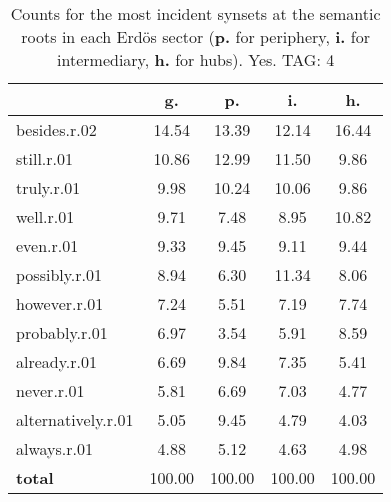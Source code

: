 \begin{table}[h!]
\begin{center}
\begin{tabular}{| l | c | c | c | c |}\hline
 & g. & p. & i. & h. \\\hline
besides.r.02 & 14.54  & 13.39  & 12.14  & 16.44 \\\hline
still.r.01 & 10.86  & 12.99  & 11.50  & 9.86 \\\hline
truly.r.01 & 9.98  & 10.24  & 10.06  & 9.86 \\\hline
well.r.01 & 9.71  & 7.48  & 8.95  & 10.82 \\\hline
even.r.01 & 9.33  & 9.45  & 9.11  & 9.44 \\\hline
possibly.r.01 & 8.94  & 6.30  & 11.34  & 8.06 \\\hline
however.r.01 & 7.24  & 5.51  & 7.19  & 7.74 \\\hline
probably.r.01 & 6.97  & 3.54  & 5.91  & 8.59 \\\hline
already.r.01 & 6.69  & 9.84  & 7.35  & 5.41 \\\hline
never.r.01 & 5.81  & 6.69  & 7.03  & 4.77 \\\hline
alternatively.r.01 & 5.05  & 9.45  & 4.79  & 4.03 \\\hline
always.r.01 & 4.88  & 5.12  & 4.63  & 4.98 \\\hline
{{\bf total}} & 100.00  & 100.00  & 100.00  & 100.00 \\\hline
\end{tabular}
\caption{Counts for the most incident synsets at the semantic roots in each Erd\"os sector ({\bf p.} for periphery, {\bf i.} for intermediary, {\bf h.} for hubs). Yes. TAG: 4}
\end{center}
\end{table}